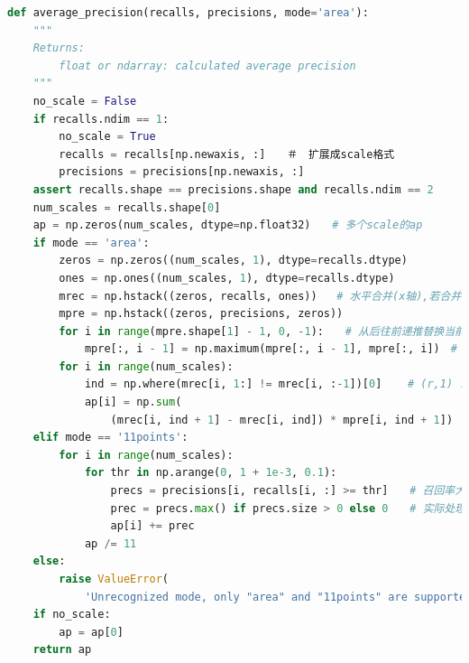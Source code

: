 \documentclass[UTF8]{ctexart}
\begin{document}
\lstset{style=mystyle}
\begin{lstlisting}[language=Python]
def average_precision(recalls, precisions, mode='area'):
    """
    Returns:
        float or ndarray: calculated average precision
    """
    no_scale = False
    if recalls.ndim == 1:
        no_scale = True
        recalls = recalls[np.newaxis, :]　　＃　扩展成scale格式
        precisions = precisions[np.newaxis, :]
    assert recalls.shape == precisions.shape and recalls.ndim == 2
    num_scales = recalls.shape[0]
    ap = np.zeros(num_scales, dtype=np.float32)　　# 多个scale的ap
    if mode == 'area':
        zeros = np.zeros((num_scales, 1), dtype=recalls.dtype)
        ones = np.ones((num_scales, 1), dtype=recalls.dtype)
        mrec = np.hstack((zeros, recalls, ones))   # 水平合并(x轴),若合并对象多维,则对应维度水平合并, (num_scales, 3)
        mpre = np.hstack((zeros, precisions, zeros))
        for i in range(mpre.shape[1] - 1, 0, -1):　　# 从后往前递推替换当前值为相邻两向量对应的较大值
            mpre[:, i - 1] = np.maximum(mpre[:, i - 1], mpre[:, i])　# 返回两向量对应位置的较大值
        for i in range(num_scales):
            ind = np.where(mrec[i, 1:] != mrec[i, :-1])[0]    # (r,1) != (0,r)
            ap[i] = np.sum(
                (mrec[i, ind + 1] - mrec[i, ind]) * mpre[i, ind + 1])  # R差*P
    elif mode == '11points':
        for i in range(num_scales):
            for thr in np.arange(0, 1 + 1e-3, 0.1):
                precs = precisions[i, recalls[i, :] >= thr]　　# 召回率大于11等分阈值对应的精度
                prec = precs.max() if precs.size > 0 else 0　　# 实际处理,取精度的极大值(修正后的P-R曲线)
                ap[i] += prec
            ap /= 11
    else:
        raise ValueError(
            'Unrecognized mode, only "area" and "11points" are supported')
    if no_scale:
        ap = ap[0]
    return ap
\end{lstlisting}
\end{document}
